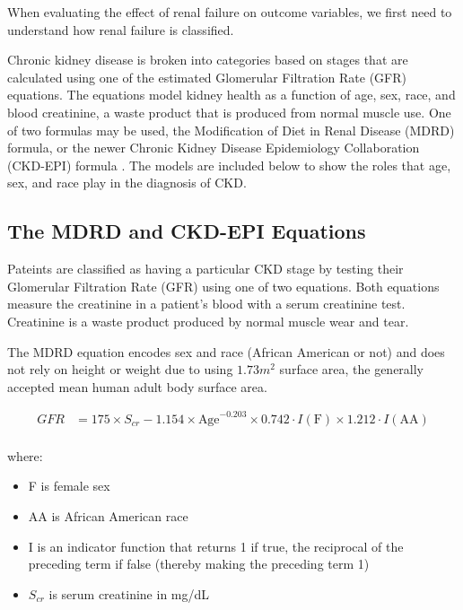 \documentclass[12pt]{ociamthesis}\usepackage[]{graphicx}\usepackage[]{color}
\begin{document}
When evaluating the effect of renal failure on outcome variables, we first need to understand how renal failure is classified.

Chronic kidney disease is broken into categories based on stages that are calculated using one of the estimated Glomerular Filtration Rate
(GFR) equations. The equations model kidney health as a function of age, sex, race, and blood creatinine, a waste product that is produced from
normal muscle use. One of two formulas may be used, the Modification of Diet in Renal Disease (MDRD) formula, or the newer
Chronic Kidney Disease Epidemiology Collaboration (CKD-EPI) formula \cite{eGFR2018}. The models are included below to show the roles that
age, sex, and race play in the diagnosis of CKD.

\subsection{The MDRD and CKD-EPI Equations}

Pateints are classified as having a particular CKD stage by testing their Glomerular Filtration Rate (GFR) using one of two equations.
Both equations measure the creatinine in a patient's blood with a serum creatinine test. Creatinine is a waste product produced by normal
muscle wear and tear. 

The MDRD equation encodes sex and race (African American or not) and does not rely on height or weight due to using $1.73m^2$ surface area,
the generally accepted mean human adult body surface area. 

\begin{equation} \label{mdrd}
\begin{split}
  GFR  &= 175 \times S_{cr} - 1.154 \times \text{Age}^{-0.203} \times 0.742 \cdot I(\text{F}) \times 1.212 \cdot I(\text{AA}) \\
\end{split}
\end{equation}

where:
\begin{itemize}
  \item F is female sex
  \item AA is African American race
  \item I is an indicator function that returns 1 if true, the reciprocal of the preceding term if false (thereby making the preceding term 1)
  \item $S_{cr}$ is serum creatinine in mg/dL
\end{itemize} \cite{Levey1999}
\end{document}
